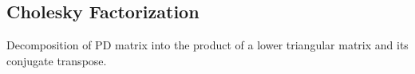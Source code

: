 \subsection{Cholesky Factorization}
\label{sec:chol}


Decomposition of PD matrix into the product of a lower triangular matrix and its conjugate transpose. 